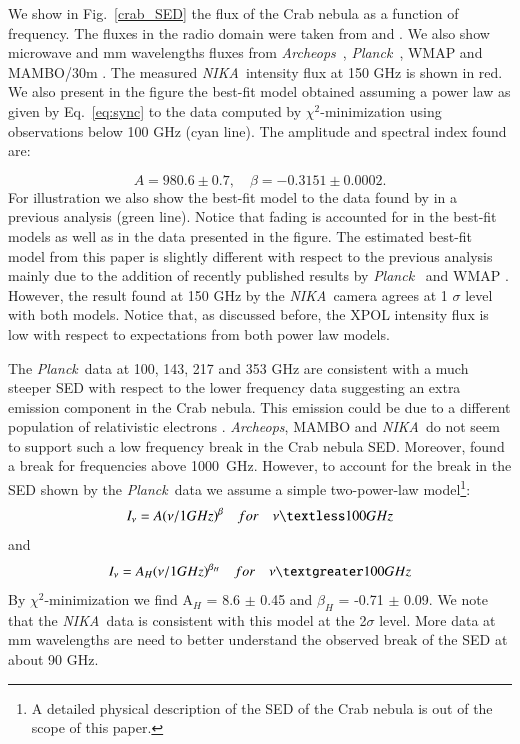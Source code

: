 \documentclass[twocolumn,traditabstract]{aa}
\def\NIKA{\textit{NIKA}}
\def\Archeops{\textit{Archeops}}
\def\Planck{\textit{Planck}}
\begin{document}
We show in Fig.~\ref{crab_SED} the flux of the Crab nebula as a function of frequency. The fluxes in the radio domain were taken from \cite{dmitrenko1970absolute} and \cite{1971IzVUZ..14..157V}. We also show microwave and mm wavelengths fluxes from \Archeops\ \citep{macias2007archeops}, \Planck\ \citep{2015arXiv150702058P}, WMAP \citep{2011ApJS..192...19W} and MAMBO/30m \citep{2002A&A...386.1044B}. The measured \NIKA\ intensity flux at 150 GHz is shown in red.
We also present in the figure the best-fit model obtained assuming a power law as given by Eq.~\ref{eq:sync} to the data computed by $\chi^2$-minimization using observations below 100 GHz (cyan line). The amplitude and spectral index found are: 

\begin{equation}
 A = 980.6 \pm 0.7  ,\quad \beta = -0.3151 \pm 0.0002. 
 \end{equation}
 For illustration we also show the best-fit model to the data found by \cite{macias2010} in a previous analysis (green line). 
Notice that fading is accounted for in the best-fit models as well as in the data presented in the figure.
The estimated best-fit model from this paper is slightly different with respect to the previous analysis mainly due to the addition of recently published results by \Planck\ \citep{2015arXiv150702058P} and  WMAP \citep{2011ApJS..192...19W}. However, the result found at 150 GHz by the \NIKA\ camera agrees at 1 $\sigma$ level with both models. 
Notice that, as discussed before, the XPOL intensity flux is low with respect to expectations from both power law models. 
 
The \Planck\ data at 100, 143, 217 and 353 GHz are consistent with a much
steeper SED with respect to the lower frequency data suggesting an extra emission
component in the Crab nebula. This emission could be due to a different
population of relativistic electrons \citep{1965ARA&A...3..297G}. 
{\it Archeops}, MAMBO
and \NIKA\ do not seem to support such a low frequency break in the Crab nebula
SED. Moreover, \cite{macias2010} found a break for frequencies above 1000~GHz. 
However, to account for the break in the SED shown by the \Planck\ data we assume a simple
two-power-law model\footnote{A detailed physical description of the SED of the
  Crab nebula is out of the scope of this paper.}:
\begin{equation}
I_{\nu} = A(\nu/1GHz)^{\beta} \quad for \quad \nu   \textless  100 GHz
\end{equation}
and 
\begin{equation}
I_{\nu} = A_{H}(\nu/1GHz)^{\beta_H} \quad for \quad \nu   \textgreater  100 GHz
\end{equation}
By $\chi^2$-minimization we find
A$_H$ = 8.6 $\pm$ 0.45 and $\beta_H$ = -0.71 $\pm$ 0.09.
We note that the \NIKA\ data is consistent with this model at the 2$\sigma$ level. More data at mm wavelengths are need to better understand the observed break of the SED at about 90 GHz. 
\end{document}
